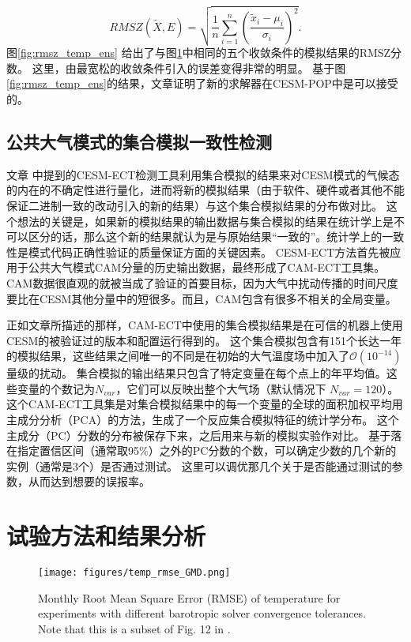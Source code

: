 \begin{equation}
 RMSZ(\tilde{X}, E) = \sqrt{\frac{1}{n}\sum_{i=1}^n(\frac{\tilde{x}_i -\mu_i}{\sigma_i})^2}. 
\label{e:rmsz}
\end{equation}
图\ref{fig:rmsz_temp_ens} 给出了与图\ref{fig:rmse_temp}中相同的五个收敛条件的模拟结果的RMSZ分数。
这里，由最宽松的收敛条件引入的误差变得非常的明显。 
基于图\ref{fig:rmsz_temp_ens}的结果，文章证明了新的求解器在CESM-POP中是可以接受的。  


\subsection{公共大气模式的集合模拟一致性检测 }
 
文章 中提到的CESM-ECT检测工具利用集合模拟的结果来对CESM模式的气候态的内在的不确定性进行量化，进而将新的模拟结果（由于软件、硬件或者其他不能保证二进制一致的改动引入的新的结果）与这个集合模拟结果的分布做对比。
这个想法的关键是，如果新的模拟结果的输出数据与集合模拟的结果在统计学上是不可以区分的话，那么这个新的结果就认为是与原始结果“一致的”。统计学上的一致性是模式代码正确性验证的质量保证方面的关键因素\citep{oberkampf2010}。
CESM-ECT方法首先被应用于公共大气模式CAM分量的历史输出数据，最终形成了CAM-ECT工具集。
CAM数据很直观的就被当成了验证的首要目标，因为大气中扰动传播的时间尺度要比在CESM其他分量中的短很多。而且，CAM包含有很多不相关的全局变量。 


 
正如文章\cite{baker2015}所描述的那样，CAM-ECT中使用的集合模拟结果是在可信的机器上使用CESM的被验证过的版本和配置运行得到的。 
这个集合模拟包含有151个长达一年的模拟结果，这些结果之间唯一的不同是在初始的大气温度场中加入了$\mathcal{O}(10^{-14})$ 量级的扰动。 
集合模拟的输出结果只包含了特定变量在每个点上的年平均值。这些变量的个数记为$N_{var}$，它们可以反映出整个大气场（默认情况下 $N_{var}=120$）。这个CAM-ECT工具集是对集合模拟结果中的每一个变量的全球的面积加权平均用主成分分析（PCA）的方法，生成了一个反应集合模拟特征的统计学分布。
这个主成分（PC）分数的分布被保存下来，之后用来与新的模拟实验作对比。 
基于落在指定置信区间（通常取95$\%$）之外的PC分数的个数，可以确定少数的几个新的实例（通常是3个）是否通过测试。 
这里可以调优那几个关于是否能通过测试的参数，从而达到想要的误报率。
\section{试验方法和结果分析}
\label{sec:verifyExp}
\begin{figure}[h]
\texttt{[image: figures/temp\_rmse\_GMD.png]}
\caption {Monthly Root Mean Square Error (RMSE) of temperature for experiments with different barotropic solver convergence tolerances. Note that this is a subset of Fig. 12 in \cite{yong2015}.}
\label{fig:rmse_temp}
\end{figure} 


